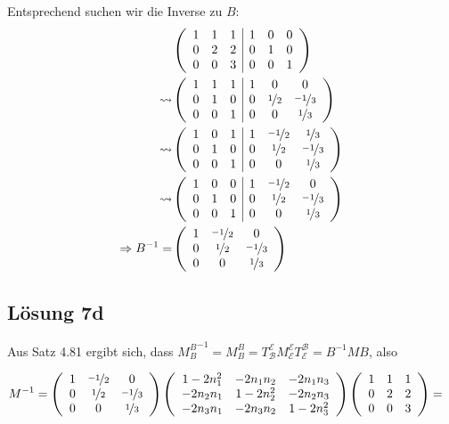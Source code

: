 \documentclass[main.tex]{subfiles}
\begin{document}
Entsprechend suchen wir die Inverse zu $B$:
\begin{align*}
    & \eqmatrix{ccc|ccc}{
        1 & 1 & 1    &    1 & 0 & 0 \\
        0 & 2 & 2    &    0 & 1 & 0 \\
        0 & 0 & 3    &    0 & 0 & 1
    }\\
    \leadsto & \eqmatrix{ccc|ccc}{
        1 & 1 & 1    &    1 & 0   & 0 \\
        0 & 1 & 0    &    0 & \nicefrac{1}{2} & \nicefrac{-1}{3} \\
        0 & 0 & 1    &    0 & 0   & \nicefrac{1}{3}
    }\\
    \leadsto & \eqmatrix{ccc|ccc}{
        1 & 0 & 1    &    1 & \nicefrac{-1}{2} & \nicefrac{1}{3} \\
        0 & 1 & 0    &    0 & \nicefrac{1}{2}  & \nicefrac{-1}{3} \\
        0 & 0 & 1    &    0 & 0    & \nicefrac{1}{3}
    }\\
    \leadsto & \eqmatrix{ccc|ccc}{
        1 & 0 & 0    &    1 & \nicefrac{-1}{2} & 0 \\
        0 & 1 & 0    &    0 & \nicefrac{1}{2}  & \nicefrac{-1}{3} \\
        0 & 0 & 1    &    0 & 0    & \nicefrac{1}{3}
    }\\
    \Rightarrow B^{-1} = & \eqmatrix{ccc}{
        1 & \nicefrac{-1}{2} & 0 \\
        0 & \nicefrac{1}{2} & \nicefrac{-1}{3} \\
        0 & 0 & \nicefrac{1}{3}
    }\\
\end{align*}

\pagebreak
\subsection*{Lösung 7d}
Aus Satz 4.81 ergibt sich, dass ${M^B_B}^{-1} = M^B_B = T^{\mathcal{E}}_{\mathcal{B}} M^{\mathcal{E}}_{\mathcal{E}} T^{\mathcal{B}}_{\mathcal{E}} = B^{-1} M B$, also

\begin{align*}
    M^{-1} &= \eqmatrix{ccc}{
        1 & \nicefrac{-1}{2} & 0 \\
        0 & \nicefrac{1}{2} & \nicefrac{-1}{3} \\
        0 & 0 & \nicefrac{1}{3}
    } \eqmatrix{ccc}{
        1-2 n_1^2   & -2 n_1 n_2 & -2 n_1 n_3 \\
        -2 n_2 n_1 & 1-2 n_2^2   & -2 n_2 n_3 \\
        -2 n_3 n_1 & -2 n_3 n_2 & 1-2 n_3^2
    } \eqmatrix{ccc}{
        1 & 1 & 1 \\
        0 & 2 & 2 \\
        0 & 0 & 3
    } = 
\end{align*}
\end{document}
